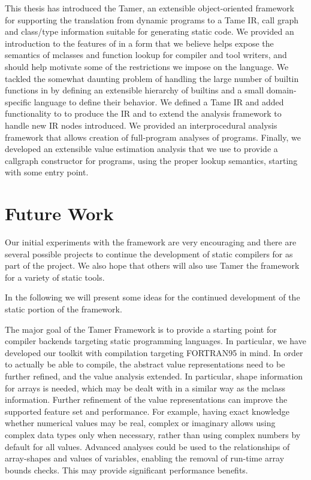 This thesis has introduced the \matlab Tamer, an extensible
object-oriented framework for supporting the translation from
dynamic \matlab programs to a Tame IR, call graph and class/type
information suitable for generating static code.  We provided an
introduction to the features of \matlab in a form that we believe
helps expose the semantics of mclasses and function lookup for
compiler and tool writers, and should help motivate some of the
restrictions we impose on the language.  We tackled the somewhat
daunting problem of handling the large number of builtin functions
in \matlab by defining an extensible hierarchy of builtins and a small
domain-specific language to define their behavior.  We defined a Tame
IR and added functionality to \mcsaf to produce the IR and to extend
the analysis framework to handle  new IR nodes introduced.  We
provided an interprocedural analysis framework that allows creation of
full-program analyses of \matlab programs.  Finally, we developed an
extensible value estimation analysis that we use to provide a
callgraph constructor for \matlab programs, using the proper
lookup semantics, starting with some entry point.

\section{Future Work}

Our initial experiments with the framework are very encouraging and there
are several possible projects to continue the development of
static compilers for \matlab as part of the \mclab project.
We also hope that others will also use Tamer the framework for a
variety of static \matlab tools.


In the following we will present some ideas
for the continued development of the static portion of the \mclab framework.


The major goal of the Tamer Framework is to provide a starting point for
compiler backends targeting static programming languages. In particular,
we have developed our toolkit with compilation targeting 
 {\sc FORTRAN95} in mind. In order to actually be able to compile,
the abstract value representations need to be further refined, and the value
analysis extended. In particular, shape information for arrays is needed,
which may be dealt with in a similar way as the mclass information.
Further refinement of the value representations can improve the supported feature
set and performance. For example, having exact knowledge whether numerical
values may be real, complex or imaginary allows using complex data types only
when necessary, rather than using complex numbers by default for all values.
Advanced analyses could be used to the relationships of array-shapes and
values of variables, enabling the removal of run-time array bounds checks.
This may provide significant performance benefits.

